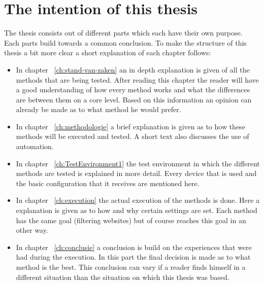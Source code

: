 \section{The intention of this thesis}
\label{sec:opzet-bachelorproef}
The thesis consists out of different parts which each have their own purpose. Each parts build towards a common conclusion. To make the structure of this thesis a bit more clear a short explanation of each chapter follows:
\begin{itemize}
\item In chapter ~\ref{ch:stand-van-zaken} an in depth explanation is given of all the methods that are being tested. After reading this chapter the reader will have a good understanding of how every method works and what the differences are between them on a core level. Based on this information an opinion can already be made as to what method he would prefer.
\item In chapter ~\ref{ch:methodologie} a brief explanation is given as to how these methods will be executed and tested. A short text also discusses the use of automation.
\item In chapter ~\ref{ch:TestEnvironment1} the test environment in which the different methods are tested is explained in more detail. Every device that is used and the basic configuration that it receives are mentioned here.
\item In chapter ~\ref{ch:execution} the actual execution of the methods is done. Here a explanation is given as to how and why certain settings are set. Each method has the same goal (filtering websites) but of course reaches this goal in an other way. 
\item In chapter ~\ref{ch:conclusie} a conclusion is build on the experiences that were had during the execution. In this part the final decision is made as to what method is the best. This conclusion can vary if a reader finds himself in a different situation than the situation on which this thesis was based.
\end{itemize}


